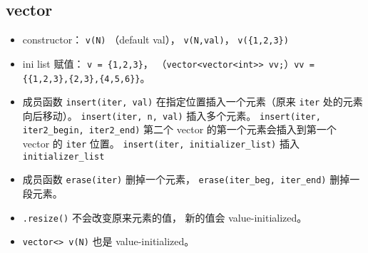 \subsection{vector}
\begin{itemize}
\item constructor： \verb|v(N)| （default val）， \verb|v(N,val)|， \verb|v({1,2,3})|
\item ini list 赋值： \verb|v = {1,2,3}|， （\verb|vector<vector<int>> vv;|）\verb|vv = {{1,2,3},{2,3},{4,5,6}}|。
\item 成员函数 \verb|insert(iter, val)| 在指定位置插入一个元素（原来 \verb|iter| 处的元素向后移动）。 \verb|insert(iter, n, val)| 插入多个元素。 \verb|insert(iter, iter2_begin, iter2_end)| 第二个 vector 的第一个元素会插入到第一个 vector 的 \verb|iter| 位置。 \verb|insert(iter, initializer_list)| 插入 \verb|initializer_list|
\item 成员函数 \verb|erase(iter)| 删掉一个元素， \verb|erase(iter_beg, iter_end)| 删掉一段元素。
\item \verb|.resize()| 不会改变原来元素的值， 新的值会 value-initialized。
\item \verb|vector<> v(N)| 也是 value-initialized。
\end{itemize}

